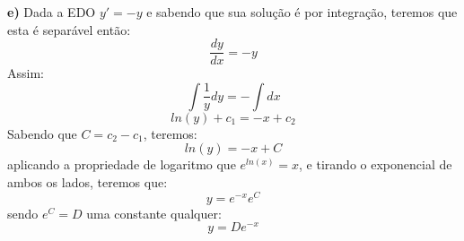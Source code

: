 \textbf{e)} Dada a EDO $y' = -y$ e sabendo que sua solução é por integração, teremos que esta é separável então:
\begin{equation*}
    \frac{dy}{dx} = -y
\end{equation*}
Assim:
\begin{equation*}
    \int \frac{1}{y}dy = -\int dx
\end{equation*}
\begin{equation*}
    ln(y) + c_1 = -x + c_2
\end{equation*}
Sabendo que $C = c_2-c_1$, teremos:
\begin{equation*}
    ln(y) = -x + C
\end{equation*}
aplicando a propriedade de logaritmo que $e^{ln(x)} = x$, e tirando o exponencial de ambos os lados, teremos que:
\begin{equation*}
    y = e^{-x}e^C
\end{equation*}
sendo $e^C=D$ uma constante qualquer:
\begin{equation*}
    \boxed{y = De^{-x}}
\end{equation*}